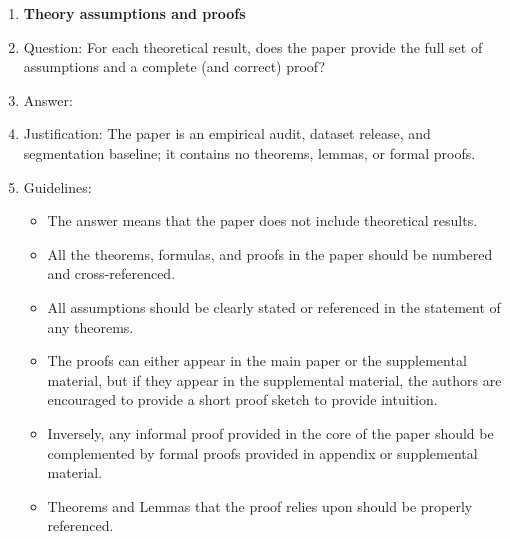 \begin{enumerate}
\item {\bf Theory assumptions and proofs}
    \item[] Question: For each theoretical result, does the paper provide the full set of assumptions and a complete (and correct) proof?
    \item[] Answer: \answerNA{}
    \item[] Justification: The paper is an empirical audit, dataset release, and segmentation baseline; it contains no theorems, lemmas, or formal proofs.
    \item[] Guidelines:
    \begin{itemize}
        \item The answer \answerNA{} means that the paper does not include theoretical results.
        \item All the theorems, formulas, and proofs in the paper should be numbered and cross-referenced.
        \item All assumptions should be clearly stated or referenced in the statement of any theorems.
        \item The proofs can either appear in the main paper or the supplemental material, but if they appear in the supplemental material, the authors are encouraged to provide a short proof sketch to provide intuition.
        \item Inversely, any informal proof provided in the core of the paper should be complemented by formal proofs provided in appendix or supplemental material.
        \item Theorems and Lemmas that the proof relies upon should be properly referenced.
    \end{itemize}


\end{enumerate}
